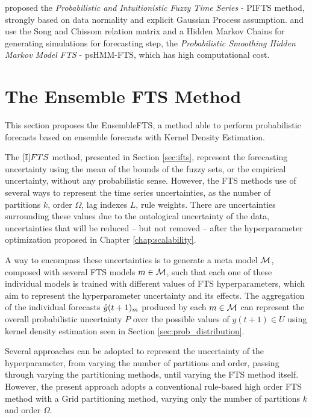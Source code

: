  \cite{Gangwar2014} proposed the \textit{Probabilistic and Intuitionistic Fuzzy Time Series} - PIFTS method, strongly based on data normality and explicit Gaussian Process assumption. \cite{Cheng2012} and \cite{Chuang2014} use the Song and Chissom relation matrix and a Hidden Markov Chains for generating simulations for forecasting step, the \textit{Probabilistic Smoothing Hidden Markov Model FTS} - psHMM-FTS, which has high computational cost.

%
\section{The Ensemble FTS Method}
\label{sec:ensemblefts}

This section proposes the EnsembleFTS, a method able to perform probabilistic forecasts based on ensemble forecasts with Kernel Density Estimation.

The $[\mathbb{I}]FTS$ method, presented in Section \ref{sec:ifts}, represent the forecasting uncertainty using the mean of the bounds of the fuzzy sets, or the empirical uncertainty, without any probabilistic sense. However, the FTS methods use of several ways to represent the time series uncertainties, as the number of partitions $k$, order $\Omega$, lag indexes $L$, rule weights. There are uncertainties surrounding these values due to the ontological uncertainty of the data, uncertainties that will be reduced -- but not removed -- after the hyperparameter optimization  proposed in Chapter \ref{chap:scalability}.

\index{$\model$}
A way to encompass these uncertainties is to generate a meta model $\model$, composed with several FTS models $m \in \mathcal{M}$, such that each one of these individual models is trained with different values of FTS hyperparameters, which aim to represent the hyperparameter uncertainty and its effects. The aggregation of the individual forecasts $\hat{y}(t+1)_m$ produced by each $m \in \mathcal{M}$ can represent the overall probabilistic uncertainty $P$ over the possible values of $y(t+1) \in U$ using kernel density estimation seen in Section \ref{sec:prob_distribution}.

Several approaches can be adopted to represent the uncertainty of the hyperparameter, from varying the number of partitions and order, passing through varying the partitioning methods, until varying the FTS method itself. However, the present approach adopts a conventional rule-based high order FTS method with a Grid partitioning method, varying only the number of partitions $k$ and order $\Omega$.

